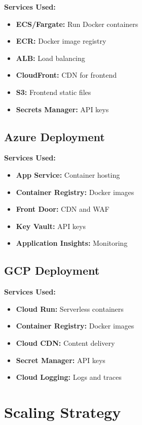 \documentclass[12pt,a4paper]{report}
\begin{document}
\textbf{Services Used:}
\begin{itemize}
    \item \textbf{ECS/Fargate:} Run Docker containers
    \item \textbf{ECR:} Docker image registry
    \item \textbf{ALB:} Load balancing
    \item \textbf{CloudFront:} CDN for frontend
    \item \textbf{S3:} Frontend static files
    \item \textbf{Secrets Manager:} API keys
\end{itemize}

\subsection{Azure Deployment}

\textbf{Services Used:}
\begin{itemize}
    \item \textbf{App Service:} Container hosting
    \item \textbf{Container Registry:} Docker images
    \item \textbf{Front Door:} CDN and WAF
    \item \textbf{Key Vault:} API keys
    \item \textbf{Application Insights:} Monitoring
\end{itemize}

\subsection{GCP Deployment}

\textbf{Services Used:}
\begin{itemize}
    \item \textbf{Cloud Run:} Serverless containers
    \item \textbf{Container Registry:} Docker images
    \item \textbf{Cloud CDN:} Content delivery
    \item \textbf{Secret Manager:} API keys
    \item \textbf{Cloud Logging:} Logs and traces
\end{itemize}

\section{Scaling Strategy}
\end{document}
